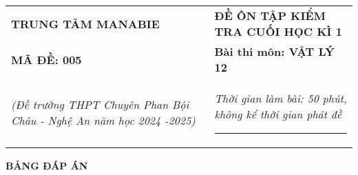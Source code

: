 \begin{tabular}{M{7.5cm}M{10.5cm}}
	\textbf{TRUNG TÂM MANABIE}& \textbf{ĐỀ ÔN TẬP KIỂM TRA CUỐI HỌC KÌ 1}\\
	\textbf{MÃ ĐỀ: 005}& \textbf{Bài thi môn: VẬT LÝ 12}\\
	\textit{(Đề trường THPT Chuyên Phan Bội Châu - Nghệ An  năm học 2024 -2025)}& \textit{Thời gian làm bài: 50 phút, không kể thời gian phát đề}
	
	\noindent\rule{4cm}{0.8pt} \\
\end{tabular}
\setcounter{section}{0}
\begin{center}
	\textbf{\large BẢNG ĐÁP ÁN}
\end{center}
\section{}
\section{}
\section{}



